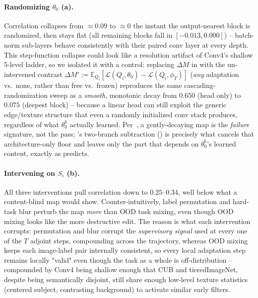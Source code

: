 \paragraph{Randomizing $\theta_0$ (a).} Correlation collapses from $\approx\!0.09$ to $\approx\!0$ the instant the output-nearest block is randomized, then stays flat (all remaining blocks fall in $[-0.013,0.000]$) -- batch-norm sub-layers behave consistently with their paired conv layer at every depth. This step-function collapse could look like a resolution artifact of Conv4's shallow 5-level ladder, so we isolated it with a control: replacing $\Delta M$ in  with the un-intervened contrast $\Delta M':=\mathbb{E}_{Q_i}[\mathcal{L}(Q_i,\theta_0)-\mathcal{L}(Q_i,\phi_T)]$ (\emph{any} adaptation vs.\ none, rather than free vs.\ frozen) reproduces the same cascading-randomization sweep as a \emph{smooth}, monotonic decay from $0.650$ (head only) to $0.075$ (deepest block) -- because a linear head can still exploit the generic edge/texture structure that even a randomly initialized conv stack produces, regardless of what $\theta_0^b$ actually learned. Per~\cite{adebayo2018sanity}, a gently-decaying map is the \emph{failure} signature, not the pass; \fama's two-branch subtraction () is precisely what cancels that architecture-only floor and leaves only the part that depends on $\theta_0^b$'s learned content, exactly as  predicts.

\paragraph{Intervening on $S_i$ (b).} All three interventions pull correlation down to $0.25$--$0.34$, well below what a content-blind map would show. Counter-intuitively, label permutation and hard-task blur perturb the map \emph{more} than OOD task mixing, even though OOD mixing looks like the more destructive edit. The reason is what each intervention corrupts: permutation and blur corrupt the \emph{supervisory signal} used at every one of the $T$ adjoint steps, compounding across the trajectory, whereas OOD mixing keeps each image-label pair internally consistent, so every local adaptation step remains locally "valid" even though the task as a whole is off-distribution -- compounded by Conv4 being shallow enough that CUB and tieredImageNet, despite being semantically disjoint, still share enough low-level texture statistics (centered subject, contrasting background) to activate similar early filters.

